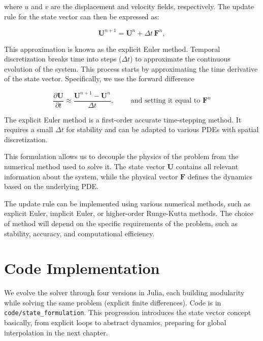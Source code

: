 where $u$ and $v$ are the displacement and velocity fields, respectively. The update rule for the state vector can then be expressed as:

\begin{equation}
\mathbf{U}^{n+1} = \mathbf{U}^n + \Delta t \, \mathbf{F}^n,
\end{equation}

\vspace{1em}

This approximation is known as the explicit Euler method. Temporal discretization breaks time into steps (\(\Delta t\)) to approximate the continuous evolution of the system. This process starts by approximating the time derivative of the state vector. Specifically, we use the forward difference

\begin{equation}
\frac{\partial \mathbf{U}}{\partial t} \approx \frac{\mathbf{U}^{n+1} - \mathbf{U}^n}{\Delta t}, \qquad \text{ and setting it equal to } \mathbf{F}^n
\label{eq:time_derivative_approx}
\end{equation}

\vspace{1em}

The explicit Euler method is a first-order accurate time-stepping method. It requires a small \(\Delta t\) for stability and can be adapted to various PDEs with spatial discretization.

This formulation allows us to decouple the physics of the problem from the numerical method used to solve it. The state vector $\mathbf{U}$ contains all relevant information about the system, while the physical vector $\mathbf{F}$ defines the dynamics based on the underlying PDE.

The update rule can be implemented using various numerical methods, such as explicit Euler, implicit Euler, or higher-order Runge-Kutta methods. The choice of method will depend on the specific requirements of the problem, such as stability, accuracy, and computational efficiency.

\clearpage

\section{Code Implementation}
\label{sec:wave_eqn_implementation}

We evolve the solver through four versions in Julia, each building modularity while solving the same problem (explicit finite differences). Code is in \texttt{code/state\_formulation}. This progression introduces the state vector concept basically, from explicit loops to abstract dynamics, preparing for global interpolation in the next chapter.

